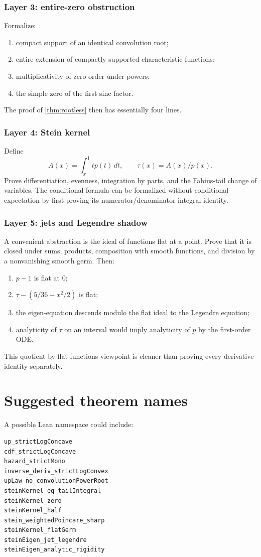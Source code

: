 \documentclass[11pt,oneside]{article}
\theoremstyle{definition}
\theoremstyle{remark}
\begin{document}
\subsubsection*{Layer 3: entire-zero obstruction}
Formalize:
\begin{enumerate}
\item compact support of an identical convolution root;
\item entire extension of compactly supported characteristic functions;
\item multiplicativity of zero order under powers;
\item the simple zero of the first sinc factor.
\end{enumerate}
The proof of \cref{thm:rootless} then has essentially four lines.

\subsubsection*{Layer 4: Stein kernel}
Define
\[
 A(x)=\int_x^1tp(t)\,dt,
 \qquad \tau(x)=A(x)/p(x).
\]
Prove differentiation, evenness, integration by parts, and the Fabius-tail change
of variables.  The conditional formula can be formalized without conditional
expectation by first proving its numerator/denominator integral identity.

\subsubsection*{Layer 5: jets and Legendre shadow}
A convenient abstraction is the ideal of functions flat at a point.  Prove that
it is closed under sums, products, composition with smooth functions, and division
by a nonvanishing smooth germ.  Then:
\begin{enumerate}
\item $p-1$ is flat at $0$;
\item $\tau-(5/36-x^2/2)$ is flat;
\item the eigen-equation descends modulo the flat ideal to the Legendre equation;
\item analyticity of $\tau$ on an interval would imply analyticity of $p$ by the
first-order ODE.
\end{enumerate}
This quotient-by-flat-functions viewpoint is cleaner than proving every derivative
identity separately.

\section{Suggested theorem names}
A possible Lean namespace could include:
\begin{lstlisting}
up_strictLogConcave
cdf_strictLogConcave
hazard_strictMono
inverse_deriv_strictLogConvex
upLaw_no_convolutionPowerRoot
steinKernel_eq_tailIntegral
steinKernel_zero
steinKernel_half
stein_weightedPoincare_sharp
steinKernel_flatGerm
steinEigen_jet_legendre
steinEigen_analytic_rigidity
\end{lstlisting}
\end{document}
